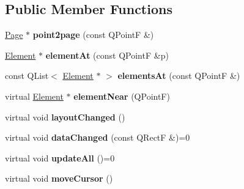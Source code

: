 \subsection*{Public Member Functions}
\begin{DoxyCompactItemize}
\item 
\mbox{\label{class_ms_1_1_muse_score_view_adeeb33788e9c40bc7a88ac0bd553ec13}} 
\hyperlink{class_ms_1_1_page}{Page} $\ast$ {\bfseries point2page} (const Q\+PointF \&)
\item 
\mbox{\label{class_ms_1_1_muse_score_view_aa29a808a6e3214a2a9e807698f641fbe}} 
\hyperlink{class_ms_1_1_element}{Element} $\ast$ {\bfseries element\+At} (const Q\+PointF \&p)
\item 
\mbox{\label{class_ms_1_1_muse_score_view_a27549ad399faa2222fe1da7f92a73450}} 
const Q\+List$<$ \hyperlink{class_ms_1_1_element}{Element} $\ast$ $>$ {\bfseries elements\+At} (const Q\+PointF \&)
\item 
\mbox{\label{class_ms_1_1_muse_score_view_a0ef1d3a617ad73884ebcb73483073003}} 
virtual \hyperlink{class_ms_1_1_element}{Element} $\ast$ {\bfseries element\+Near} (Q\+PointF)
\item 
\mbox{\label{class_ms_1_1_muse_score_view_a71ab04532cb99c055139fa4cae46cff8}} 
virtual void {\bfseries layout\+Changed} ()
\item 
\mbox{\label{class_ms_1_1_muse_score_view_add97900dd0c89bc296379fa308095291}} 
virtual void {\bfseries data\+Changed} (const Q\+RectF \&)=0
\item 
\mbox{\label{class_ms_1_1_muse_score_view_aea875986ccdc61414ae216df50b60a22}} 
virtual void {\bfseries update\+All} ()=0
\item 
\mbox{\label{class_ms_1_1_muse_score_view_ac4a710539324f69104599c63ddda106c}} 
virtual void {\bfseries move\+Cursor} ()
\item 
\mbox{\label{class_ms_1_1_muse_score_view_a59550b3b38934a81b2d7745576deebc2}} 

\end{DoxyCompactItemize}
